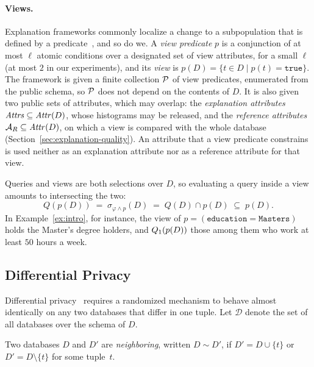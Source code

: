 \paragraph{Views.}
Explanation frameworks commonly localize a change to a subpopulation that is defined by a predicate~\cite{FEDEX,TaoGMR22,wu2013}, and so do we.
A \emph{view predicate} $p$ is a conjunction of at most $\ell$ atomic conditions over a designated set of view attributes, for a small $\ell$ (at most $2$ in our experiments), and its \emph{view} is $p(D)=\{t\in D \mid p(t)=\texttt{true}\}$.
The framework is given a finite collection $\mathcal{P}$ of view predicates, enumerated from the public schema, so $\mathcal{P}$ does not depend on the contents of $D$.
It is also given two public sets of attributes, which may overlap: the \emph{explanation attributes} $\mathit{Attrs}\subseteq\mathit{Attr}(D)$, whose histograms may be released, and the \emph{reference attributes} $\mathcal{A}_R\subseteq\mathit{Attr}(D)$, on which a view is compared with the whole database (Section~\ref{sec:explanation-quality}).
An attribute that a view predicate constrains is used neither as an explanation attribute nor as a reference attribute for that view.

Queries and views are both selections over $D$, so evaluating a query inside a view amounts to intersecting the two:
\begin{equation}
Q(p(D)) \;=\; \sigma_{\varphi\wedge p}(D) \;=\; Q(D)\cap p(D)\;\subseteq\; p(D).
\label{eq:view-restriction}
\end{equation}
In Example~\ref{ex:intro}, for instance, the view of $p = (\texttt{education}=\texttt{Masters})$ holds the Master's degree holders, and $Q_1(p(D))$ those among them who work at least $50$ hours a week.

\subsection{Differential Privacy}
\label{subsec:prelim-dp}

Differential privacy~\cite{DMNS2006,TheAlgFoundDP2014} requires a randomized mechanism to behave almost identically on any two databases that differ in one tuple. Let $\mathcal{D}$ denote the set of all databases over the schema of $D$.

\begin{definition}
\label{def:neighboring}
Two databases $D$ and $D'$ are \emph{neighboring}, written $D\sim D'$, if $D'=D\cup\{t\}$ or $D'=D\setminus\{t\}$ for some tuple~$t$.
\end{definition}

